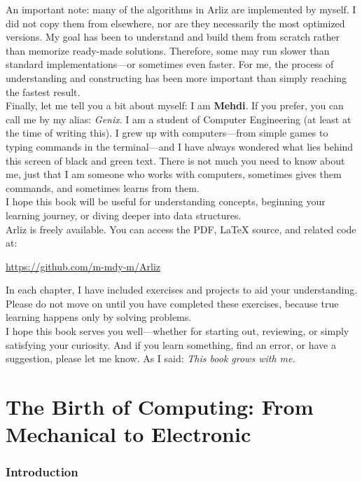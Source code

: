 \documentclass[12pt, oneside]{book}
\begin{document}
	An important note: many of the algorithms in Arliz are implemented by myself. I did not copy them from elsewhere, nor are they necessarily the most optimized versions. My goal has been to understand and build them from scratch rather than memorize ready-made solutions. Therefore, some may run slower than standard implementations—or sometimes even faster. For me, the process of understanding and constructing has been more important than simply reaching the fastest result.\\	
	Finally, let me tell you a bit about myself:  
	I am \textbf{Mehdi}. If you prefer, you can call me by my alias: \emph{Genix}. I am a student of Computer Engineering (at least at the time of writing this). I grew up with computers—from simple games to typing commands in the terminal—and I have always wondered what lies behind this screen of black and green text. There is not much you need to know about me, just that I am someone who works with computers, sometimes gives them commands, and sometimes learns from them.\\	
	I hope this book will be useful for understanding concepts, beginning your learning journey, or diving deeper into data structures. \\	
	Arliz is freely available. You can access the PDF, LaTeX source, and related code at:  
	\begin{center}
		\url{https://github.com/m-mdy-m/Arliz}
	\end{center}
	In each chapter, I have included exercises and projects to aid your understanding. Please do not move on until you have completed these exercises, because true learning happens only by solving problems.\\	
	I hope this book serves you well—whether for starting out, reviewing, or simply satisfying your curiosity. And if you learn something, find an error, or have a suggestion, please let me know. As I said:
	\emph{This book grows with me.}
	\tableofcontents
	\renewcommand{\arraystretch}{1.5} %
	\mainmatter

\part{The Birth of Computing: From Mechanical to Electronic}
\section*{Introduction}
\end{document}
